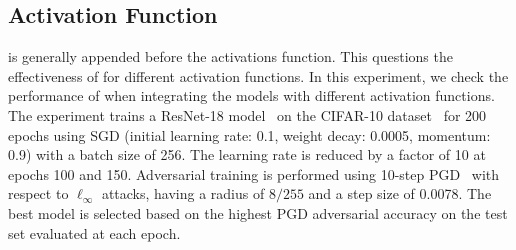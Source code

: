 \documentclass[conference]{IEEEtran}
\begin{document}

\subsection{Activation Function}\label{abl:activation}
\sys is generally appended before the activations function. This questions the effectiveness of \sys for different activation functions. In this experiment, we check the performance of \sys when integrating the models with different activation functions. 
The experiment trains a ResNet-18 model~\cite{ddihz15} on the CIFAR-10 dataset~\cite{lmlk09} for 200 epochs using SGD (initial learning rate: 0.1, weight decay: 0.0005, momentum: 0.9) with a batch size of 256. The learning rate is reduced by a factor of 10 at epochs 100 and 150. Adversarial training is performed using 10-step PGD~\cite{tdlmm18} with respect to $\ell_\infty$ attacks, having a radius of $8/255$ and a step size of 0.0078. The best model is selected based on the highest PGD adversarial accuracy on the test set evaluated at each epoch.
\end{document}
